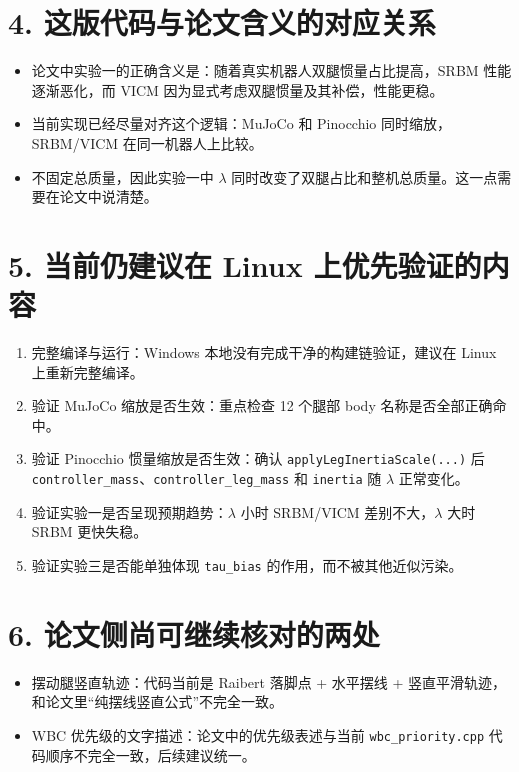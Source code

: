 \documentclass[11pt]{ctexart}
\begin{document}
\section*{4. 这版代码与论文含义的对应关系}
\begin{itemize}
  \item 论文中实验一的正确含义是：随着真实机器人双腿惯量占比提高，SRBM 性能逐渐恶化，而 VICM 因为显式考虑双腿惯量及其补偿，性能更稳。
  \item 当前实现已经尽量对齐这个逻辑：MuJoCo 和 Pinocchio 同时缩放，SRBM/VICM 在同一机器人上比较。
  \item 不固定总质量，因此实验一中 $\lambda$ 同时改变了双腿占比和整机总质量。这一点需要在论文中说清楚。
\end{itemize}

\section*{5. 当前仍建议在 Linux 上优先验证的内容}
\begin{enumerate}
  \item 完整编译与运行：Windows 本地没有完成干净的构建链验证，建议在 Linux 上重新完整编译。
  \item 验证 MuJoCo 缩放是否生效：重点检查 12 个腿部 body 名称是否全部正确命中。
  \item 验证 Pinocchio 惯量缩放是否生效：确认 \texttt{applyLegInertiaScale(...)} 后 \texttt{controller\_mass}、\texttt{controller\_leg\_mass} 和 \texttt{inertia} 随 $\lambda$ 正常变化。
  \item 验证实验一是否呈现预期趋势：$\lambda$ 小时 SRBM/VICM 差别不大，$\lambda$ 大时 SRBM 更快失稳。
  \item 验证实验三是否能单独体现 \texttt{tau\_bias} 的作用，而不被其他近似污染。
\end{enumerate}

\section*{6. 论文侧尚可继续核对的两处}
\begin{itemize}
  \item 摆动腿竖直轨迹：代码当前是 Raibert 落脚点 + 水平摆线 + 竖直平滑轨迹，和论文里“纯摆线竖直公式”不完全一致。
  \item WBC 优先级的文字描述：论文中的优先级表述与当前 \texttt{wbc\_priority.cpp} 代码顺序不完全一致，后续建议统一。
\end{itemize}
\end{document}
